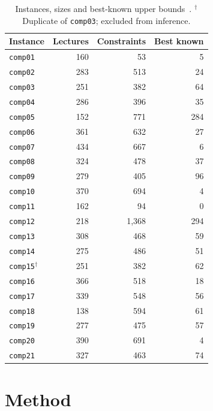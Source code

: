 \documentclass[journal]{IEEEtran}
\newcommand{\code}[1]{\texttt{#1}}
\begin{document}
\begin{table}[!t]
\caption{Instances, sizes and best-known upper bounds~\cite{ceschia2022educational}. $^\dagger$Duplicate of \code{comp03}; excluded from inference.}
\label{tab:instances}
\centering
\small
\begin{tabular}{l r r r}
\toprule
Instance & Lectures & Constraints & Best known \\
\midrule
\code{comp01} & 160 & 53 & 5 \\
\code{comp02} & 283 & 513 & 24 \\
\code{comp03} & 251 & 382 & 64 \\
\code{comp04} & 286 & 396 & 35 \\
\code{comp05} & 152 & 771 & 284 \\
\code{comp06} & 361 & 632 & 27 \\
\code{comp07} & 434 & 667 & 6 \\
\code{comp08} & 324 & 478 & 37 \\
\code{comp09} & 279 & 405 & 96 \\
\code{comp10} & 370 & 694 & 4 \\
\code{comp11} & 162 & 94 & 0 \\
\code{comp12} & 218 & 1{,}368 & 294 \\
\code{comp13} & 308 & 468 & 59 \\
\code{comp14} & 275 & 486 & 51 \\
\code{comp15}$^\dagger$ & 251 & 382 & 62 \\
\code{comp16} & 366 & 518 & 18 \\
\code{comp17} & 339 & 548 & 56 \\
\code{comp18} & 138 & 594 & 61 \\
\code{comp19} & 277 & 475 & 57 \\
\code{comp20} & 390 & 691 & 4 \\
\code{comp21} & 327 & 463 & 74 \\
\bottomrule
\end{tabular}
\end{table}

\section{Method}
\end{document}

